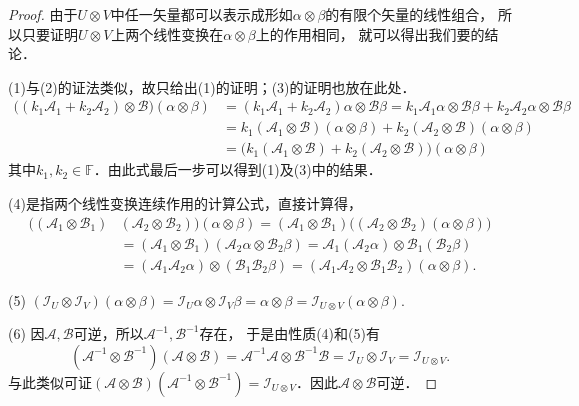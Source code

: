 \begin{proof}
    由于$U\otimes V$中任一矢量都可以表示成形如$\alpha\otimes\beta$的有限个矢量的线性组合，
    所以只要证明$U\otimes V$上两个线性变换在$\alpha\otimes\beta$上的作用相同，
    就可以得出我们要的结论．

    (1)与(2)的证法类似，故只给出(1)的证明；(3)的证明也放在此处．
    \begin{align*}
        \bigl((k_1\mathcal{A}_1+k_2\mathcal{A}_2)\otimes \mathcal{B}\bigr) (\alpha\otimes\beta)
        &=(k_1\mathcal{A}_1+k_2\mathcal{A}_2)\alpha \otimes \mathcal{B}\beta
        =k_1\mathcal{A}_1\alpha\otimes \mathcal{B}\beta +k_2\mathcal{A}_2\alpha \otimes \mathcal{B}\beta \\
        &= k_1(\mathcal{A}_1\otimes \mathcal{B})(\alpha\otimes\beta)
         +k_2(\mathcal{A}_2\otimes \mathcal{B})(\alpha\otimes\beta)  \\
        &= \bigl(k_1(\mathcal{A}_1\otimes \mathcal{B})
         +k_2(\mathcal{A}_2\otimes \mathcal{B})\bigr)(\alpha\otimes\beta)
    \end{align*}  %
    其中$k_1,k_2\in \mathbb{F}$．由此式最后一步可以得到(1)及(3)中的结果．

    (4)是指两个线性变换连续作用的计算公式，直接计算得，
    \begin{equation*}
        \begin{aligned}
            \bigl((\mathcal{A}_1\otimes \mathcal{B}_1)&
              (\mathcal{A}_2\otimes \mathcal{B}_2)\bigr) (\alpha\otimes\beta)
            =(\mathcal{A}_1\otimes \mathcal{B}_1)
            \bigl((\mathcal{A}_2\otimes \mathcal{B}_2) (\alpha\otimes\beta) \bigr)\\
            &=(\mathcal{A}_1\otimes \mathcal{B}_1)
            (\mathcal{A}_2\alpha\otimes \mathcal{B}_2\beta)
            =\mathcal{A}_1(\mathcal{A}_2\alpha)\otimes \mathcal{B}_1(\mathcal{B}_2\beta) \\
            &=(\mathcal{A}_1\mathcal{A}_2\alpha)\otimes (\mathcal{B}_1\mathcal{B}_2\beta)
            =(\mathcal{A}_1\mathcal{A}_2\otimes \mathcal{B}_1\mathcal{B}_2)(\alpha\otimes\beta) .
        \end{aligned}
    \end{equation*}

    (5)
       $ (\mathcal{I}_U\otimes \mathcal{I}_V) (\alpha\otimes\beta) =
        \mathcal{I}_U \alpha \otimes \mathcal{I}_V \beta =
        \alpha\otimes\beta = \mathcal{I}_{U\otimes V}(\alpha\otimes\beta). $

    (6) 因$\mathcal{A},\mathcal{B}$可逆，所以$\mathcal{A}^{-1},\mathcal{B}^{-1}$存在，
    于是由性质(4)和(5)有
    \begin{equation*}
        (\mathcal{A}^{-1}\otimes \mathcal{B}^{-1})(\mathcal{A}\otimes \mathcal{B})
        =\mathcal{A}^{-1}\mathcal{A}\otimes \mathcal{B}^{-1}\mathcal{B}
        =\mathcal{I}_U\otimes \mathcal{I}_V = \mathcal{I}_{U\otimes V} .
    \end{equation*}
    与此类似可证$(\mathcal{A}\otimes \mathcal{B})(\mathcal{A}^{-1}\otimes \mathcal{B}^{-1})
    =\mathcal{I}_{U\otimes V}$．因此$\mathcal{A}\otimes \mathcal{B}$可逆．
\end{proof}

